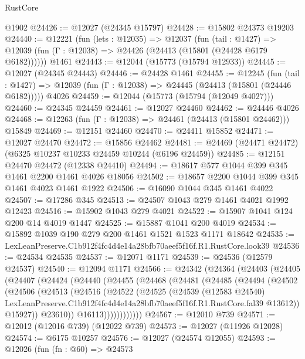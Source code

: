 \begin{lexlean}{RustCore}
\begin{coremodule}
    @1902
@24426 := @12027 (@24345 @15797)
@24428 := @15802 @24373 @19203
@24440 := @12221
    (fun (lets : @12035) =>
    @12037
      (fun (tail : @1427) =>
      @12039 (fun (Γ : @12038) => @24426 (@24413 (@15801 (@24428 @6179 @6182))))))
    @1461
@24443 := @12044 (@15773 (@15794 @12933))
@24445 := @12027 (@24345 @24443)
@24446 := @24428 @1461
@24455 := @12245
    (fun (tail : @1427) => @12039 (fun (Γ : @12038) => @24445 (@24413 (@15801 (@24446 @6182)))))
    @4026
@24459 := @12044 (@15773 (@15794 (@12049 @4027)))
@24460 := @24345 @24459
@24461 := @12027 @24460
@24462 := @24446 @4026
@24468 := @12263 (fun (Γ : @12038) => @24461 (@24413 (@15801 @24462))) @15849
@24469 := @12151 @24460
@24470 := @24411 @15852
@24471 := @12027 @24470
@24472 := @15856 @24462
@24481 := @24469 (@24471 @24472) (@6325 @10237 @10233 @24459 @10244 (@6196 @24459))
@24485 := @12151 @24470 @24472 (@12338 @24410)
@24494 := @18617 @577 @1044 @399 @345 @1461 @2200 @1461 @4026 @18056
@24502 := @18657 @2200 @1044 @399 @345 @1461 @4023 @1461 @1922
@24506 := @16090 @1044 @345 @1461 @4022
@24507 := @17286 @345
@24513 := @24507 @1043 @279 @1461 @4021 @1992 @12423
@24516 := @15902 @1043 @279 @4021
@24522 := @15907 @1041 @124 @200 @14 @4019 @1447
@24525 := @15887 @1041 @200 @4019
@24534 := @15892 @1039 @190 @279 @200 @1461 @1521 @1523 @1171 @18642
@24535 := LexLeanPreserve.C1b912f4fc4d4e14a28bfb70aeef5f16f.R1.RustCore.look39
@24536 := @24534 @24535
@24537 := @12071 @1171
@24539 := @24536 (@12579 @24537)
@24540 := @12094 @1171
@24566 := @24342
    (@24364
      (@24403
        (@24405
          (@24407
            (@24424
              (@24440
                (@24455
                  (@24468
                    (@24481
                      (@24485
                        (@24494
                          (@24502
                            (@24506
                              (@24513
                                (@24516
                                  (@24522
                                    (@24525
                                      (@24539
                                        (@12583 @24540)
                                        LexLeanPreserve.C1b912f4fc4d4e14a28bfb70aeef5f16f.R1.RustCore.fal39
                                        @13612))
                                    @15927))
                                @23610))
                            @16113))))))))))))
@24567 := @12010 @739
@24571 := @12012 (@12016 @739) (@12022 @739)
@24573 := @12027 (@11926 @12028)
@24574 := @6175 @10257
@24576 := @12027 (@24574 @12055)
@24593 := @12026
    (fun (fn : @60) =>
    @24573

\end{coremodule}
\end{lexlean}
